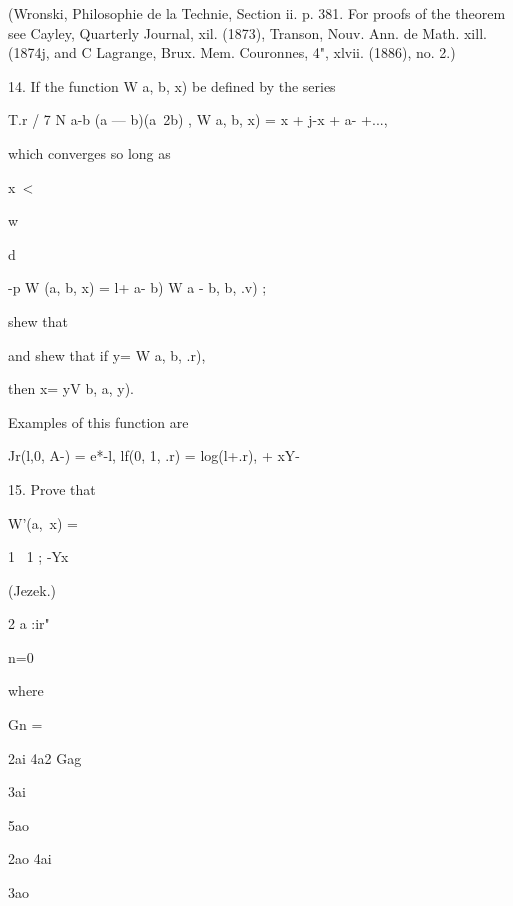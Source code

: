 {{(Wronski, Philosophie de la Technie, Section ii. p. 381. For proofs of
the theorem see Cayley, Quarterly Journal, xil. (1873), Transon, Nouv.
Ann. de Math. xill. (1874j, and C Lagrange, Brux. Mem. Couronnes, 4",
xlvii. (1886), no. 2.)

14. If the function W a, b, x) be defined by the series

T.r / 7 N a-b (a — b)(a~2b) , W a, b, x) = x + j-x + a- +...,



which converges so long as



x\ <



w



d



-p W (a, b, x) = l+ a- b) W a - b, b, .v) ;



shew that

and shew that if y= W a, b, .r),

then x= yV b, a, y).

Examples of this function are

Jr(l,0, A-) = e*-l, lf(0, 1, .r) = log(l+.r), + xY-\



15. Prove that



W'(a, \,x) =



1 \ 1 ; -Yx



(Jezek.)



2 a :ir"

n=0



where



Gn =



2ai 4a2 Gag



3ai

5ao





2ao 4ai







3ao



}}
